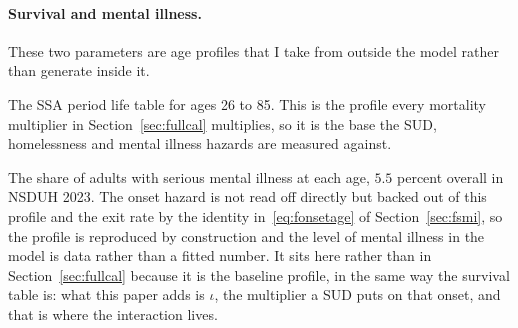 \documentclass[10pt]{article}
\begin{document}
\paragraph{Survival and mental illness.} These two parameters are age profiles that I take from outside the model rather than generate inside it.
\begin{description}\setlength{\itemsep}{0.25em}\setlength{\parskip}{0em}
\item[$\bar\phi(j)$, baseline survival by age.] The SSA period life table for ages
26 to 85. This is the profile every mortality multiplier in
Section~\ref{sec:fullcal} multiplies, so it is the base the SUD, homelessness and
mental illness hazards are measured against.

\item[$p_m$, the age profile of SMI prevalence.]
The share of adults with serious mental illness at each age, $5.5$
percent overall in NSDUH 2023. The onset hazard is not read off directly but backed
out of this profile and the exit rate by the identity in~\eqref{eq:fonsetage} of
Section~\ref{sec:fsmi}, so the profile is reproduced by construction and the level
of mental illness in the model is data rather than a fitted number. It sits here
rather than in Section~\ref{sec:fullcal} because it is the baseline profile, in the
same way the survival table is: what this paper adds is $\iota$, the multiplier a
SUD puts on that onset, and that is where the interaction lives.

\end{description}
\end{document}
